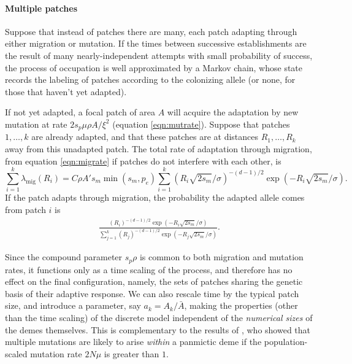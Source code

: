 \documentclass[10pt,letterpaper]{article}
\newcommand{\migrate}{\lambda_\text{mig}}
\begin{document}
\paragraph{Multiple patches}

Suppose that instead of patches there are many,
each patch adapting through either migration or mutation.
If the times between successive establishments are the result of many nearly-independent attempts
with small probability of success,
the process of occupation is well approximated by a Markov chain,
whose state records the labeling of patches according to the colonizing allele
(or none, for those that haven't yet adapted).

If not yet adapted, a focal patch of area $A$ will acquire the adaptation by new mutation at rate $2 s_p \mu \rho A/\xi^2$ (equation \eqref{eqn:mutrate}).
Suppose that patches $1, \ldots, k$ are already adapted,
and that these patches are at distances $R_1, \ldots, R_k$ away from this unadapted patch.
The total rate of adaptation through migration, from equation \eqref{eqn:migrate}
if patches do not interfere with each other, 
is
\begin{equation} \label{eqn:total_migrate}
    \sum_{i=1}^k \migrate(R_i) = C \rho A' s_m \min(s_m,p_e) \sum_{i=1}^{k} \left(R_i \sqrt{2 s_m} /\sigma \right)^{-(d-1)/2} \exp\left(- R_i \sqrt{2 s_m} /\sigma\right).
\end{equation}
If the patch adapts through migration, the probability the adapted allele 
comes from patch $i$ is 
\begin{align}   \label{eqn:migprob}
  \frac{
      \left(R_i \right)^{-(d-1)/2} \exp\left(- R_i \sqrt{2 s_m} 
      /\sigma\right)
  } {
      \sum_{j=1}^{k}  \left(R_j \right)^{-(d-1)/2} \exp\left(- R_j \sqrt{2 s_m}
    /\sigma\right) 
} .
\end{align}

Since the compound parameter $s_p \rho$ is common to both migration and mutation rates,
it functions only as a time scaling of the process, 
and therefore has no effect on the final configuration, namely, 
the sets of patches sharing the genetic basis of their adaptive response.
We can also rescale time by the typical patch size, and introduce a parameter, say $a_k = A_k/\bar A$,
making the properties (other than the time scaling) of the discrete model independent of the \emph{numerical sizes} of the demes themselves.
This is complementary to the results of \cite{softsweepsII}, who showed that multiple mutations are likely to arise \emph{within} a panmictic deme
if the population-scaled mutation rate $2 N \mu$ is greater than $1$.
\end{document}
